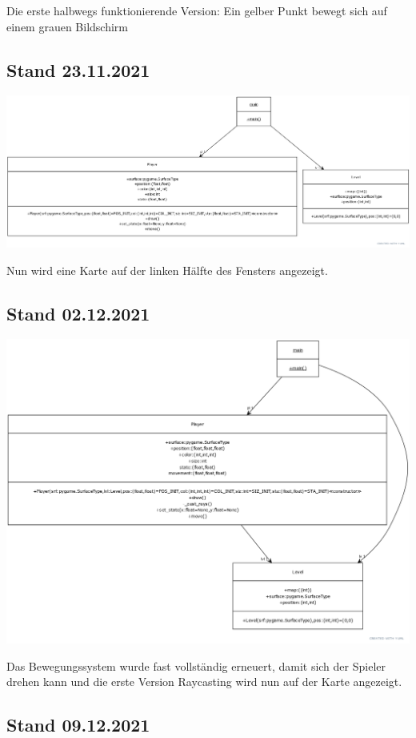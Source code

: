 \documentclass[a4paper,titlepage]{article}
\begin{document}
Die erste halbwegs funktionierende Version: Ein gelber Punkt bewegt sich auf einem grauen Bildschirm

\subsection{Stand 23.11.2021}

\includegraphics[scale=0.25]{./img/yuml-2}

Nun wird eine Karte auf der linken Hälfte des Fensters angezeigt.

\subsection{Stand 02.12.2021}

\includegraphics[scale=0.31]{./img/yuml-3}

Das Bewegungssystem wurde fast vollständig erneuert, damit sich der Spieler drehen kann und die erste Version Raycasting wird nun auf der Karte angezeigt.

\subsection{Stand 09.12.2021}
\end{document}

